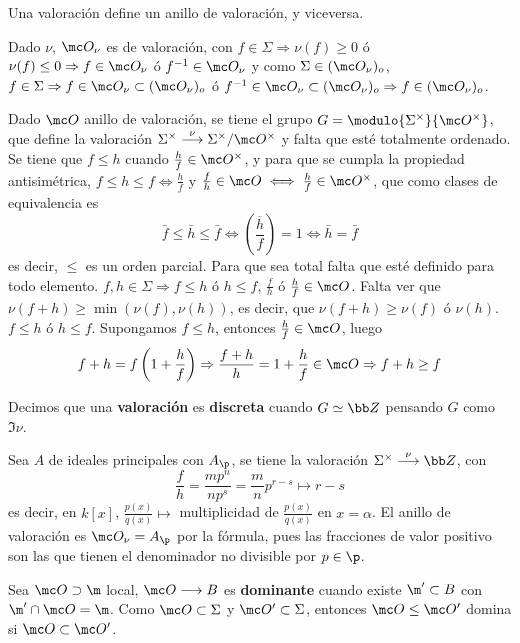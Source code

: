 \begin{prop}
    Una valoraci\'on define un anillo de valoraci\'on, y viceversa.
\end{prop}
\begin{dem} 
Dado $\nu$, $\mc O_{\nu}$ es de valoraci\'on, con $f\in \Sigma \Rightarrow \nu(f) \ge 0$ \'o $\nu(f) \le 0 \Rightarrow f\in \mc O_{\nu}$ \'o $f^{-1}\in \mc O_{\nu}$ y como $\Sigma \in (\mc O_{\nu})_o$, $f\in \Sigma \Rightarrow f\in\mc O_{\nu}\subset (\mc O_{\nu})_o$ \'o $f^{-1} \in \mc O_{\nu} \subset (\mc O_{\nu})_o \Rightarrow f\in (\mc O_{\nu})_o$. 

Dado $\mc O$ anillo de valoraci\'on, se tiene el grupo $G=\modulo{\Sigma^{\times}}{\mc O^{\times}}$, que define la valoraci\'on  $\Sigma^{\times} \overset{\nu}{\longrightarrow} \Sigma^{\times} / \mc O^{\times}$ y falta que est\'e totalmente ordenado. Se tiene que $f \le h$ cuando $\frac{h}{f} \in \mc O^{\times}$, y para que se cumpla la propiedad antisim\'etrica, $f\le h \le f \iff \frac{h}{f}$ y $\frac{f}{h} \in \mc O \iff \frac{h}{f} \in \mc O^{\times}$, que como clases de equivalencia es 
$$\bar f \le \bar h \le \bar f \iff \left( \overline{\frac{h}{f}} \right)=1 \iff \bar h = \bar f$$
es decir, $\le$ es un orden parcial. Para que sea total falta que est\'e definido para todo elemento. $f, h\in \Sigma \Rightarrow f\le h$ \'o $h \le f$, $\frac{f}{h}$ \'o $\frac{h}{f} \in \mc O$. Falta ver que $\nu(f+h) \ge \min(\nu(f),\nu(h))$, es decir, que $\nu(f+h) \ge \nu(f)$ \'o $\nu(h)$.  $f \le h$ \'o $h \le f$. Supongamos $f \le h$, entonces $\frac{h}{f} \in \mc O$, luego 
$$f+h = f\left(1+\frac{h}{f}\right) \Rightarrow \frac{f+h}{h} = 1+\frac{h}{f} \in \mc O \Rightarrow f+h \ge f$$ 
\end{dem}
\begin{defi}
    Decimos que una \textbf{valoraci\'on} es \textbf{discreta} cuando $G \simeq \bb Z$ pensando $G$ como $\Im \nu$. 
\end{defi}
\begin{ejem}
    Sea $A$ de ideales principales con $A_\p$, se tiene la valoraci\'on $\Sigma^{\times} \overset{\nu}{\longrightarrow} \bb Z$, con
    $$\frac{f}{h} = \frac{mp^n}{np^s} = \frac{m}{n} p^{r-s} \longmapsto r-s$$
    es decir, en $k[x]$, $\frac{p(x)}{q(x)} \longmapsto$ multiplicidad de $\frac{p(x)}{q(x)}$ en $x=\alpha$. El anillo de valoraci\'on es $\mc O_{\nu} = A_\p$ por la f\'ormula, pues las fracciones de valor positivo son las que tienen el denominador no divisible por $p\in \p$. 
\end{ejem}
\begin{defi}
   Sea $\mc O \supset \m$ local, $\mc O \longrightarrow B$ es \textbf{dominante} cuando existe $\m ' \subset B$ con $\m' \cap \mc O = \m$. Como $\mc O \subset \Sigma$ y $\mc O'\subset \Sigma$, entonces $\mc O \le \mc O'$ domina si $\mc O \subset \mc O'$. 
\end{defi}
